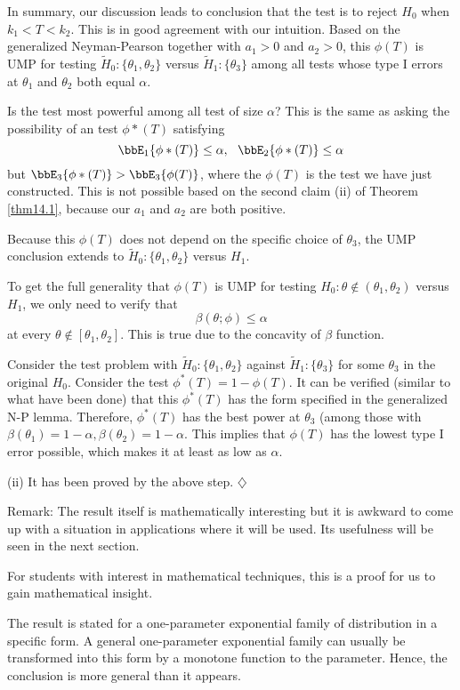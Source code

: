 In summary, our discussion leads to conclusion that the test
is to reject $H_0$ when $k_1 < T < k_2$. This is in good
agreement with our intuition. 
Based on the generalized Neyman-Pearson together
with  $a_1>0$ and $a_2 > 0$, this $\phi(T)$
is UMP for testing $\tilde H_0:
\{ \theta_1, \theta_2\}$ versus $\tilde H_1: \{\theta_3\}$
among all tests whose type I errors at $\theta_1$ and $\theta_2$
both equal $\alpha$.

Is the test most powerful among all test of size $\alpha$?
This is the same as asking the possibility of an test $\phi*(T)$ 
satisfying
\[
\bbE_1\{\phi*(T)\} \leq \alpha,~~ \bbE_2\{\phi*(T)\} \leq \alpha
\]
but $\bbE_3\{\phi*(T)\} >  \bbE_3\{\phi(T)\}$, where
the $\phi(T)$ is the test we have just constructed.
This is not possible based on the second claim (ii) of
Theorem \ref{thm14.1}, because our $a_1$ and $a_2$ are both positive.

Because this $\phi(T)$ does not depend on the specific
choice of $\theta_3$, the UMP conclusion
extends to $\tilde H_0: \{ \theta_1, \theta_2\}$ versus $ H_1$.

To get the full generality that $\phi(T)$ is UMP for
testing $H_0: \theta \not \in ( \theta_1, \theta_2)$ versus $ H_1$,
we only need to verify that
\[
\beta(\theta; \phi) \leq \alpha
\]
at every $\theta \not \in [ \theta_1, \theta_2]$.
This is true due to the concavity of $\beta$ function. 

Consider the test problem with ${\tilde H}_0: \{\theta_1, \theta_2\}$ against
${\tilde H}_1: \{\theta_3\}$ for some $\theta_3$ in the original $H_0$.
Consider the test $\phi^*(T) = 1 - \phi(T)$.
It can be verified (similar to what have been done)
that this $\phi^*(T)$ has the form specified
in the generalized N-P lemma.
Therefore, $\phi^*(T)$ has the best power at $\theta_3$ 
(among those with $\beta(\theta_1) = 1 - \alpha, \beta(\theta_2) = 1 - \alpha$.
This implies that $\phi(T)$ has the lowest type I error possible, 
which makes it at least as low as $\alpha$. 

(ii) It has been proved by the above step.
\hfill{$\diamondsuit$}

\vs\vs
\no
Remark: The result itself is mathematically interesting
but it is awkward to come up with a situation in applications where it
will be used.
Its usefulness will be seen in the next section.

\vs\vs
\no
For students with interest in mathematical techniques, this is a proof
for us to gain mathematical insight.

\vs\vs
\no
The result is stated for a one-parameter exponential family of
distribution in a specific form. A general one-parameter exponential family 
can usually be transformed into this form by a monotone function
to the parameter. Hence, the conclusion is more general than
it appears.

